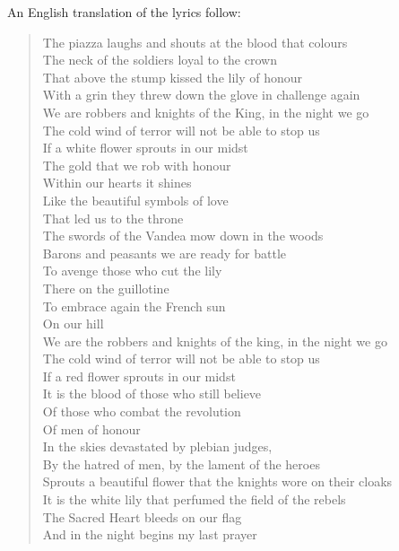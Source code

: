 An English translation of the lyrics follow:

\begin{quotex}
\begin{verse}
The piazza laughs and shouts at the blood that colours\\
The neck of the soldiers loyal to the crown\\
That above the stump kissed the lily of honour\\
With a grin they threw down the glove in challenge again\\
We are robbers and knights of the King, in the night we go\\
The cold wind of terror will not be able to stop us\\
If a white flower sprouts in our midst\\
The gold that we rob with honour\\
Within our hearts it shines\\
Like the beautiful symbols of love\\
That led us to the throne\\
The swords of the Vandea mow down in the woods\\
Barons and peasants we are ready for battle\\
To avenge those who cut the lily\\
There on the guillotine\\
To embrace again the French sun\\
On our hill\\
We are the robbers and knights of the king, in the night we go\\
The cold wind of terror will not be able to stop us\\
If a red flower sprouts in our midst\\
It is the blood of those who still believe\\
Of those who combat the revolution\\
Of men of honour\\
In the skies devastated by plebian judges,\\
By the hatred of men, by the lament of the heroes\\
Sprouts a beautiful flower that the knights wore on their cloaks\\
It is the white lily that perfumed the field of the rebels\\
The Sacred Heart bleeds on our flag\\
And in the night begins my last prayer\\

\end{verse}
\end{quotex}
